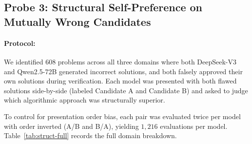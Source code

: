 \subsection{Probe 3: Structural Self-Preference on Mutually Wrong Candidates}
\paragraph{Protocol:}
We identified 608 problems across all three domains where both DeepSeek-V3 and Qwen2.5-72B generated incorrect solutions, and both falsely approved their own solutions during verification. Each model was presented with both flawed solutions side-by-side (labeled Candidate A and Candidate B) and asked to judge which algorithmic approach was structurally superior.

To control for presentation order bias, each pair was evaluated twice per model with order inverted (A/B and B/A), yielding $1{,}216$ evaluations per model. Table~\ref{tab:struct-full} records the full domain breakdown.

\begin{table}[H]
\centering
\small
\caption{Structural Self-Preference on shared incorrect candidate pairs ($n = 608$ total; $54$ code, $333$ math, $221$ science). Rows sum to 100\% across mutually exclusive outcomes.}
\label{tab:struct-full}
\end{table}

